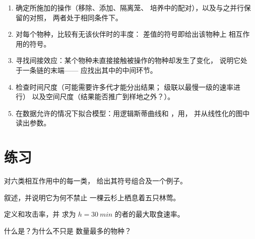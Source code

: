 \begin{method}[由实验读出相互作用]\label{met:b1:species-interactions:reading}
\begin{enumerate}
  \item 确定所施加的操作（移除、添加、隔离笼、
        培养中的配对），以及与之并行保留的对照，
        两者处于相同条件下。
  \item 对每个物种，比较有无该伙伴时的丰度：
        差值的符号即给出该物种上
        相互作用的符号。
  \item 寻找间接效应：某个物种未直接接触被操作的物种却发生了变化，
        说明它处于一条链的末端——
        应找出其中的中间环节。
  \item 检查时间尺度（可能需要许多代才能分出结果；
        级联以最慢一级的速率进行）
        以及空间尺度（结果能否推广到样地之外？）。
  \item 在数据允许的情况下拟合模型：用逻辑斯蒂曲线和
        ，用，
        并从线性化的图中读出参数。
\end{enumerate}
\end{method}

\section{练习}

\begin{exercise}[$\star$]\label{exo:b1:species-interactions:1}
对六类相互作用中的每一类，
给出其符号组合及一个例子。
\end{exercise}

\begin{exercise}[$\star$]\label{exo:b1:species-interactions:2}
叙述，并说明它为何不禁止
一棵云杉上栖息着五只林莺。
\end{exercise}

\begin{exercise}[$\star$]\label{exo:b1:species-interactions:3}
定义和攻击率，并
求为 $h = \qty{30}{min}$ 的者的最大取食速率。
\end{exercise}

\begin{exercise}[$\star$]\label{exo:b1:species-interactions:4}
什么是？为什么不只是
数量最多的物种？
\end{exercise}

